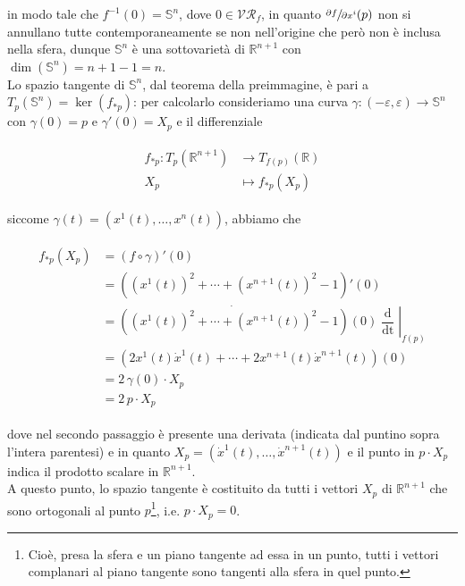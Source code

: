 in modo tale che $ f^{-1}(0) = \mathbb{S}^{n} $, dove $ 0 \in \mathcal{VR}_{f} $, in quanto $ \sfrac{\partial f}{\partial x^{i}} (p) $ non si annullano tutte contemporaneamente se non nell'origine che però non è inclusa nella sfera, dunque $ \mathbb{S}^{n} $ è una sottovarietà di $ \mathbb{R}^{n+1} $ con $ \dim(\mathbb{S}^{n}) = n+1-1 = n $.\\
Lo spazio tangente di $ \mathbb{S}^{n} $, dal teorema della preimmagine, è pari a $ T_{p}(\mathbb{S}^{n}) = \ker(f_{*p}) $: per calcolarlo consideriamo una curva $ \gamma : (-\varepsilon,\varepsilon) \to \mathbb{S}^{n} $ con $ \gamma(0) = p $ e $ \gamma'(0) = X_{p} $ e il differenziale

\begin{align}
	\begin{split}
		f_{*p} : T_{p}(\mathbb{R}^{n+1}) &\to T_{f(p)}(\mathbb{R})\\
		X_{p} &\mapsto f_{*p}(X_{p})
	\end{split}
\end{align}

siccome $ \gamma(t) = (x^{1}(t),\dots,x^{n}(t)) $, abbiamo che

\begin{align}
	\begin{split}
		f_{*p}(X_{p}) &= (f \circ \gamma)'(0)\\
		&= ((x^{1}(t))^{2} + \cdots + (x^{n+1}(t))^{2} - 1)'(0)\\
		&= \dot{((x^{1}(t))^{2} + \cdots + (x^{n+1}(t))^{2} - 1)}(0) \left. \dfrac{\operatorname{d}}{\operatorname{dt}} \right|_{f(p)}\\
		&= (2 x^{1}(t) \dot{x}^{1}(t) + \cdots + 2 x^{n+1}(t) \dot{x}^{n+1}(t))(0)\\
		&= 2 \, \gamma(0) \cdot X_{p}\\
		&= 2 \, p \cdot X_{p}
	\end{split}
\end{align}

dove nel secondo passaggio è presente una derivata (indicata dal puntino sopra l'intera parentesi) e in quanto $ X_{p} = (\dot{x}^{1}(t),\dots,\dot{x}^{n+1}(t)) $ e il punto in $ p \cdot X_{p} $ indica il prodotto scalare in $ \mathbb{R}^{n+1} $.\\
A questo punto, lo spazio tangente è costituito da tutti i vettori $ X_{p} $ di $ \mathbb{R}^{n+1} $ che sono ortogonali al punto $ p $\footnote{%
	Cioè, presa la sfera e un piano tangente ad essa in un punto, tutti i vettori complanari al piano tangente sono tangenti alla sfera in quel punto.%
}, i.e. $ p \cdot X_{p} = 0 $.

